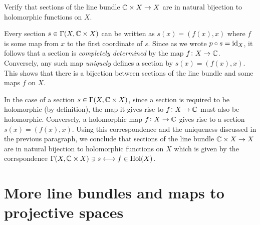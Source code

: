 \documentclass[11pt, a4paper]{article}
\begin{document}
\begin{exercise}
  Verify that sections of the line bundle $\mathbb{C} \times X \to X$ are in
  natural bijection to holomorphic functions on $X$.
\end{exercise}
\begin{solution}
  Every section $s \in \Gamma(X,\mathbb{C} \times X)$ can be written
  as $s(x) = (f(x),x)$ where $f$ is some map from $x$ to the first
  coordinate of $s$.
  Since as we wrote $p \circ s = \operatorname{id}_X$, it follows that a section is
  \textit{completely determined} by the map $f \colon X \to \mathbb{C}$.
  Conversely, any such map \textit{uniquely} defines a section by $s(x) = (f(x),x)$.
  This shows that there is a bijection between sections of the line bundle
  and some maps $f$ on $X$.

  In the case of a section $s \in \Gamma(X,\mathbb{C} \times X)$,
  since a section is required to be holomorphic (by definition),
  the map it gives rise to $f \colon X \to \mathbb{C}$ must also be holomorphic.
  Conversely, a holomorphic map $f \colon X \to \mathbb{C}$ gives rise
  to a section $s(x) = (f(x),x)$.
  Using this correspondence and the uniqueness discussed in the previous
  paragraph, we conclude that sections of the line bundle $\mathbb{C} \times X \to X$
  are in natural bijection to holomorphic functions on $X$
  which is given by
  the corrspondence
  $\Gamma(X,\mathbb{C} \times X) \ni s \longleftrightarrow f \in \mathrm{Hol}(X)$.
\end{solution}

\newpage

\section{More line bundles and maps to projective spaces}
\end{document}
